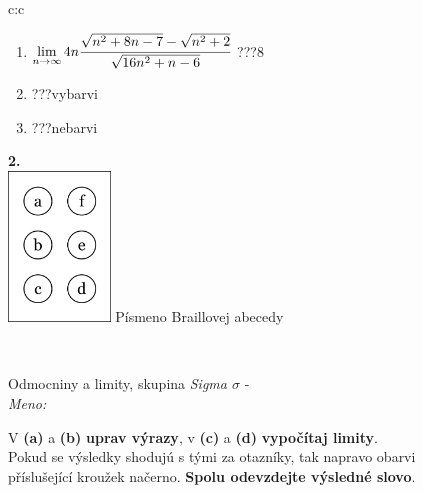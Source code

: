 \documentclass[10pt]{report}
\begin{document}
\begin{tabular}{c:c}
\begin{minipage}[c][104.5mm][t]{0.5\linewidth}
\begin{center}
\begin{minipage}{0.79\linewidth}
\begin{center}
\begin{varwidth}{\linewidth}
\begin{enumerate}
\item $\lim\limits_{n\to\infty}4n\cfrac{\sqrt{n^2+8n-7}-\sqrt{n^2+2}}{\sqrt{16n^2+n-6}}$\quad \dotfill\; ???\;\dotfill \quad $8$
\item \quad \dotfill\; ???\;\dotfill \quad vybarvi
\item \quad \dotfill\; ???\;\dotfill \quad nebarvi
\end{enumerate}
\end{varwidth}
\end{center}
\end{minipage}
\begin{minipage}{0.20\linewidth}
\begin{center}
{\Huge\bfseries 2.} \\[2mm]
\includegraphics[height=40mm]{../images/braille.png}
{\small Písmeno Braillovej abecedy}
\end{center}
\end{minipage}
\end{center}
\end{minipage}
\\ \hdashline
\begin{minipage}[c][104.5mm][t]{0.5\linewidth}
\begin{center}
\vspace{7mm}
{\huge Odmocniny a limity, skupina \textit{Sigma $\sigma$} -}\\[5mm]
\textit{Meno:}\phantom{xxxxxxxxxxxxxxxxxxxxxxxxxxxxxxxxxxxxxxxxxxxxxxxxxxxxxxxxxxxxxxxxx}\\[5mm]
\begin{minipage}{0.95\linewidth}
\begin{center}
V \textbf{(a)} a \textbf{(b)} \textbf{uprav výrazy}, v \textbf{(c)} a \textbf{(d)} \textbf{vypočítaj limity}.\\Pokud se výsledky shodujú s tými za otazníky, tak napravo obarvi\\příslušející kroužek načerno. \textbf{Spolu odevzdejte výsledné slovo}.
\end{center}
\end{minipage}
\\[1mm]

\end{center}
\end{minipage}
\end{tabular}
\end{document}
